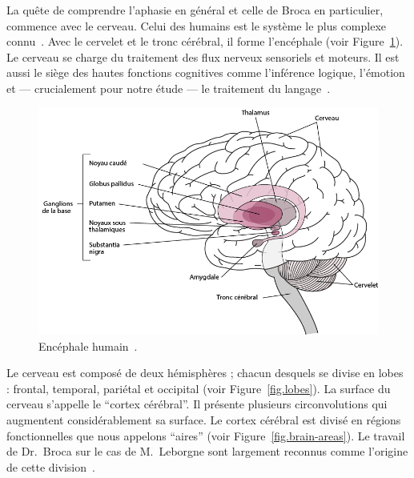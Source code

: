 
La quête de comprendre l'aphasie en général et celle de Broca en particulier, commence avec le cerveau.
Celui des humains est le système le plus complexe connu~\cite{Sciences_Medicine_Ackerman_1992}.
Avec le cervelet et le tronc cérébral, il forme l'encéphale (voir Figure~\ref{fig.brain}).
Le cerveau se charge du traitement des flux nerveux sensoriels et moteurs.
Il est aussi le siège des hautes fonctions cognitives comme l'inférence logique, l'émotion 
et --- crucialement pour notre étude --- le traitement du langage~\cite{Fodor_1983}.

\begin{figure}[htb]
    \begin{center}
        \includegraphics[width=.8\textwidth]{assets/images/brain.png}
    \end{center}
    \caption[Encéphale humain.]
    {Encéphale humain~\cite{Figure}.}
    \label{fig.brain}
\end{figure}

Le cerveau est composé de deux hémisphères ; chacun desquels se divise en lobes : 
frontal, temporal, pariétal et occipital (voir Figure~\ref{fig.lobes}).
La surface du cerveau s'appelle le ``cortex cérébral''.
Il présente plusieurs circonvolutions qui augmentent considérablement sa surface.
Le cortex cérébral est divisé en régions fonctionnelles que nous appelons ``aires''
(voir Figure~\ref{fig.brain-areas}).
Le travail de Dr.~Broca sur le cas de M.~Leborgne sont largement reconnus 
comme l'origine de cette division~\cite{Fodor_1983}.

